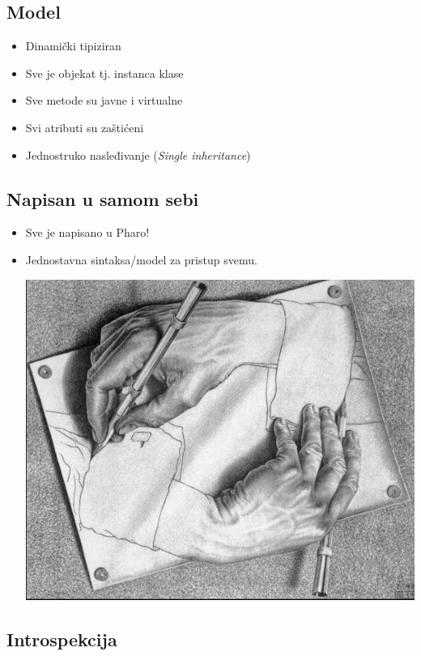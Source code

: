 \documentclass[presentation]{beamer}
\begin{document}
\subsection{Model}
\label{sec:org235338b}

\begin{itemize}
\item Dinamički tipiziran
\item Sve je objekat tj. instanca klase
\item Sve metode su javne i virtualne
\item Svi atributi su zaštićeni
\item Jednostruko nasleđivanje (\emph{Single inheritance})
\end{itemize}

\subsection{Napisan u samom sebi}
\label{sec:org9e924a8}

\begin{itemize}
\item Sve je napisano u Pharo!
\item Jednostavna sintaksa/model za pristup svemu.

\begin{center}
\includegraphics[width=.9\linewidth]{./slike/hands.jpg}
\end{center}
\end{itemize}

\subsection{Introspekcija}
\label{sec:orgb48ab58}
\end{document}
